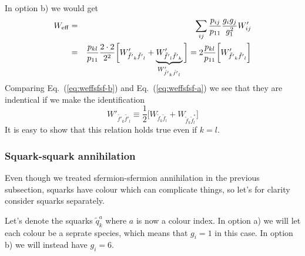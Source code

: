 In option b) we would get 
\begin{eqnarray}
    W_{\rm eff} & = & \sum_{ij}\frac{p_{ij}}{p_{11}} 
    \frac{g_{i}g_{j}}{g_{1}^2} W'_{ij}
    \nonumber \\
    & = & \frac{p_{kl}}{p_{11}} \frac{2 \cdot 2}{2^2}
    \bigg[ 
    W'_{\tilde{f'}_{k} \tilde{f'}_{l}} +
    \underbrace{W'_{\tilde{f'}_{l} \tilde{f'}_{k}}}_
       {W'_{\tilde{f'}_{k} \tilde{f'}_{l}}} \bigg]
    = 2 \frac{p_{kl}}{p_{11}} \bigg[
    W'_{\tilde{f'}_{k} \tilde{f'}_{l}}\bigg]
    \label{eq:weffsfsf-b}
\end{eqnarray}
Comparing Eq.~(\ref{eq:weffsfsf-b}) and Eq.~(\ref{eq:weffsfsf-a}) we 
see that they are indentical if we make the identification
\begin{equation}
    W'_{\tilde{f'}_{k} \tilde{f'}_{l}} \equiv 
    \frac{1}{2} \bigg[
    W_{\tilde{f}_{k} \tilde{f}_{l}} + 
    W_{\tilde{f}_{k} \tilde{f}_{l}^*} \bigg] 
\end{equation}
It is easy to show that this relation holds true even if $k=l$.

\subsubsection{Squark-squark annihilation}
\label{sec:sqsq}

Even though we treated sfermion-sfermion annihilation in the previous subsection, squarks have colour which can complicate things, so let's for clarity consider squarks separately.

Let's denote the squarks $\tilde{q}_k^a$ where $a$ is now a colour index. In option a) we will let each colour be a seprate species, which means that $g_i=1$ in this case. In option b) we will instead have $g_i=6$.

